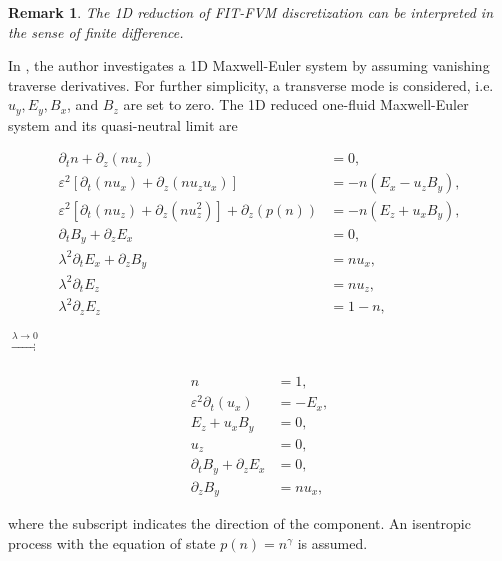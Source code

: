 \documentclass{article}
\newtheorem*{remark}{Remark}
\begin{document}
\begin{remark}
    The 1D reduction of FIT-FVM discretization can be interpreted in the sense of finite difference. 
\end{remark}

In \cite{degond_2012}, the author investigates a 1D Maxwell-Euler system by assuming vanishing traverse derivatives. For further simplicity, a transverse mode is considered, i.e. $u_y, E_y, B_x$, and $B_z$ are set to zero.  The 1D reduced one-fluid Maxwell-Euler system and its quasi-neutral limit are 

\vspace{-0.3cm}
\begin{minipage}{0.6\textwidth}
    \begin{align*}
        \partial_t n + \partial_z(nu_z) &= 0, \\
        \varepsilon^2[\partial_t(nu_x) + \partial_z(nu_zu_x)] &= - n(E_x - u_zB_y), \\
        \varepsilon^2[\partial_t(nu_z) + \partial_z(nu_z^2)] + \partial_z(p(n)) &= -n(E_z + u_xB_y), \\
        \partial_t B_y + \partial_z E_x &= 0, \\
        \lambda^2 \partial_t E_x + \partial_z B_y &= nu_x, \\
        \lambda^2 \partial_t E_z &= nu_z, \\
        \lambda^2 \partial_z E_z &= 1 - n,
    \end{align*}
\end{minipage}
$\xrightarrow[]{\lambda \rightarrow 0}$
\begin{minipage}{0.3\textwidth}
    \begin{align*}
        n &= 1,\\
        \varepsilon^2 \partial_t(u_x) &= - E_x, \\
        E_z + u_xB_y &= 0, \\
        u_z &= 0, \\
        \partial_t B_y + \partial_z E_x &= 0, \\
        \partial_z B_y &= nu_x,
    \end{align*}
\end{minipage}
where the subscript indicates the direction of the component. An isentropic process with the equation of state $p(n) = n^\gamma$ is assumed. 
\end{document}
